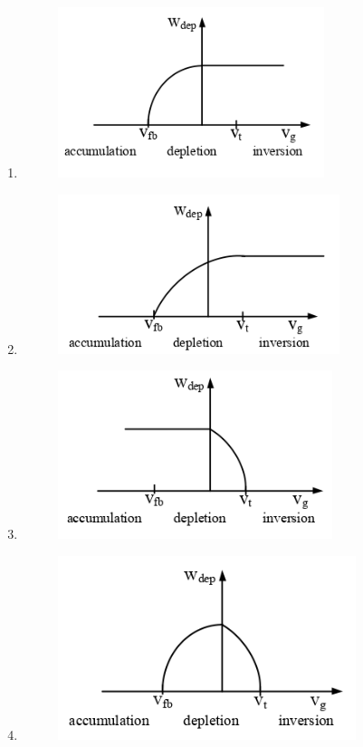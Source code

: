 \documentclass[a4paper, 11pt]{article}
\begin{document}
\begin{enumerate}
    \begin{enumerate}
        \item \begin{figure}[H] \centering \includegraphics[width=0.45\columnwidth]{figs/Q9A.png} \caption*{} \label{fig:q19a} \end{figure}
        \item \begin{figure}[H] \centering \includegraphics[width=0.45\columnwidth]{figs/Q9B.png} \caption*{} \label{fig:q19b} \end{figure}
        \item \begin{figure}[H] \centering \includegraphics[width=0.45\columnwidth]{figs/Q9C.png} \caption*{} \label{fig:q19c} \end{figure}
        \item \begin{figure}[H] \centering \includegraphics[width=0.45\columnwidth]{figs/Q9D.png} \caption*{} \label{fig:q19d} \end{figure}
    \end{enumerate}
    

\end{enumerate}
\end{document}
